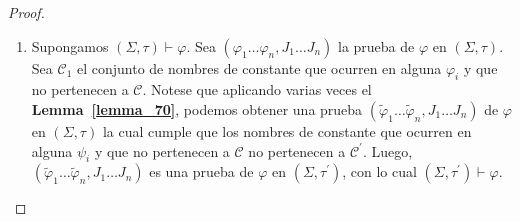   \begin{proof}
    \PN \newline
    \begin{enumerate}[(1)]
      \item Supongamos $(\Sigma, \tau) \vdash \varphi$. Sea $(\varphi_{1} \dotsc \varphi_{n}, J_{1} \dotsc J_{n})$ la
        prueba de $\varphi$ en $(\Sigma, \tau)$. Sea $\mathcal{C}_{1}$ el conjunto de nombres de constante que ocurren
        en alguna $\varphi_{i}$ y que no pertenecen a $\mathcal{C}$. Notese que aplicando varias veces el
        \textbf{Lemma~\ref{lemma_70}}, podemos obtener una prueba $(\tilde{\varphi}_{1} \dotsc \tilde{\varphi}_{n},
        J_{1} \dotsc J_{n})$ de $\varphi$ en $(\Sigma, \tau)$ la cual cumple que los nombres de constante que ocurren en
        alguna $\psi_{i}$ y que no pertenecen a $\mathcal{C}$ no pertenecen a $\mathcal{C}^{\prime}$. Luego,
        $(\tilde{\varphi}_{1} \dotsc \tilde{\varphi}_{n}, J_{1} \dotsc J_{n})$ es una prueba de $\varphi$ en $(\Sigma,
        \tau^{\prime})$, con lo cual $(\Sigma, \tau^{\prime}) \vdash \varphi$.


\end{enumerate}
\end{proof}
